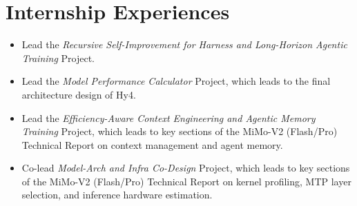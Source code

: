\section{Internship Experiences}





\begin{small}
\begin{itemize}
\item Lead the \textit{Recursive Self-Improvement for Harness and Long-Horizon Agentic Training} Project.
\item Lead the \textit{Model Performance Calculator} Project, which leads to the final architecture design of Hy4.
\end{itemize}
\end{small}

\begin{small}
\begin{itemize}
\item Lead the \textit{Efficiency-Aware Context Engineering and Agentic Memory Training} Project, which leads to key sections of the MiMo-V2 (Flash/Pro) Technical Report on context management and agent memory.
\item Co-lead \textit{Model-Arch and Infra Co-Design} Project, which leads to key sections of the MiMo-V2 (Flash/Pro) Technical Report on kernel profiling, MTP layer selection, and inference hardware estimation.
\end{itemize}
\end{small}


